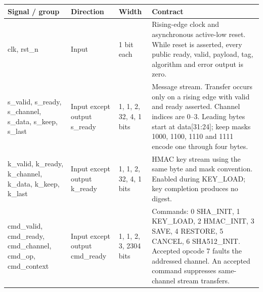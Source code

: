 \documentclass[11pt,a4paper]{article}
\begin{document}
{\small\renewcommand{\arraystretch}{1.18}\begin{longtable}{@{}L{0.21\textwidth}|L{0.12\textwidth}|L{0.12\textwidth}|L{0.45\textwidth}@{}}\toprule

\textbf{Signal /\allowbreak{} group} & \textbf{Direction} & \textbf{Width} & \textbf{Contract}\\\midrule\endhead

clk,\allowbreak{} rst\_\allowbreak{}n & Input & 1 bit each & Rising-edge clock and asynchronous active-low reset. While reset is asserted,\allowbreak{} every public ready,\allowbreak{} valid,\allowbreak{} payload,\allowbreak{} tag,\allowbreak{} algorithm and error output is zero.\\[2pt]\hline

s\_\allowbreak{}valid,\allowbreak{} s\_\allowbreak{}ready,\allowbreak{} s\_\allowbreak{}channel,\allowbreak{} s\_\allowbreak{}data,\allowbreak{} s\_\allowbreak{}keep,\allowbreak{} s\_\allowbreak{}last & Input except output s\_\allowbreak{}ready & 1,\allowbreak{} 1,\allowbreak{} 2,\allowbreak{} 32,\allowbreak{} 4,\allowbreak{} 1 bits & Message stream. Transfer occurs only on a rising edge with valid and ready asserted. Channel indices are 0–3. Leading bytes start at data[\allowbreak{}31:24]\allowbreak{}; keep masks 1000,\allowbreak{} 1100,\allowbreak{} 1110 and 1111 encode one through four bytes.\\[2pt]\hline

k\_\allowbreak{}valid,\allowbreak{} k\_\allowbreak{}ready,\allowbreak{} k\_\allowbreak{}channel,\allowbreak{} k\_\allowbreak{}data,\allowbreak{} k\_\allowbreak{}keep,\allowbreak{} k\_\allowbreak{}last & Input except output k\_\allowbreak{}ready & 1,\allowbreak{} 1,\allowbreak{} 2,\allowbreak{} 32,\allowbreak{} 4,\allowbreak{} 1 bits & HMAC key stream using the same byte and mask convention. Enabled during KEY\_\allowbreak{}LOAD; key completion produces no digest.\\[2pt]\hline

cmd\_\allowbreak{}valid,\allowbreak{} cmd\_\allowbreak{}ready,\allowbreak{} cmd\_\allowbreak{}channel,\allowbreak{} cmd\_\allowbreak{}op,\allowbreak{} cmd\_\allowbreak{}context & Input except output cmd\_\allowbreak{}ready & 1,\allowbreak{} 1,\allowbreak{} 2,\allowbreak{} 3,\allowbreak{} 2304 bits & Commands: 0 SHA\_\allowbreak{}INIT,\allowbreak{} 1 KEY\_\allowbreak{}LOAD,\allowbreak{} 2 HMAC\_\allowbreak{}INIT,\allowbreak{} 3 SAVE,\allowbreak{} 4 RESTORE,\allowbreak{} 5 CANCEL,\allowbreak{} 6 SHA512\_\allowbreak{}INIT. Accepted opcode 7 faults the addressed channel. An accepted command suppresses same-channel stream transfers.\\[2pt]\hline


\end{longtable}}
\end{document}
